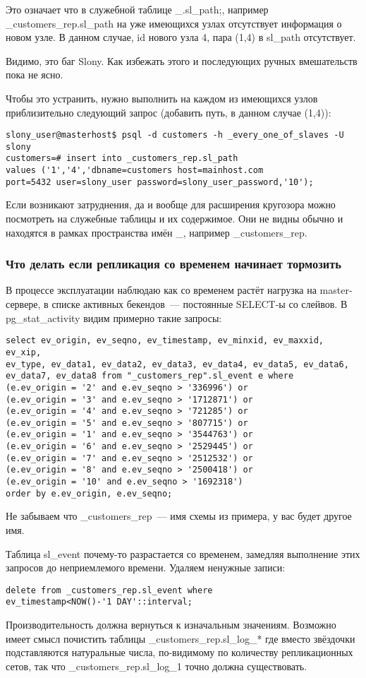 Это означает что в служебной таблице \_<имя кластера>.sl\_path;, например 
\_customers\_rep.sl\_path на уже имеющихся узлах отсутствует информация о новом узле. В данном случае, 
id нового узла 4, пара (1,4) в sl\_path отсутствует.

Видимо, это баг Slony. Как избежать этого и последующих ручных вмешательств пока не ясно.

Чтобы это устранить, нужно выполнить на каждом из имеющихся узлов приблизительно следующий запрос 
(добавить путь, в данном случае (1,4)):
\begin{verbatim}
slony_user@masterhost$ psql -d customers -h _every_one_of_slaves -U slony
customers=# insert into _customers_rep.sl_path 
values ('1','4','dbname=customers host=mainhost.com 
port=5432 user=slony_user password=slony_user_password,'10');
\end{verbatim}

Если возникают затруднения, да и вообще для расширения кругозора можно посмотреть на служебные таблицы 
и их содержимое. Они не видны обычно и находятся в рамках пространства имён \_<имя кластера>, 
например \_customers\_rep. 

\subsubsection{Что делать если репликация со временем начинает тормозить}
В процессе эксплуатации наблюдаю как со временем растёт нагрузка на master-сервере, в списке активных бекендов~--- 
постоянные SELECT-ы со слейвов. В pg\_stat\_activity видим примерно такие запросы:
\begin{verbatim}
select ev_origin, ev_seqno, ev_timestamp, ev_minxid, ev_maxxid, ev_xip, 
ev_type, ev_data1, ev_data2, ev_data3, ev_data4, ev_data5, ev_data6, 
ev_data7, ev_data8 from "_customers_rep".sl_event e where 
(e.ev_origin = '2' and e.ev_seqno > '336996') or 
(e.ev_origin = '3' and e.ev_seqno > '1712871') or 
(e.ev_origin = '4' and e.ev_seqno > '721285') or 
(e.ev_origin = '5' and e.ev_seqno > '807715') or 
(e.ev_origin = '1' and e.ev_seqno > '3544763') or 
(e.ev_origin = '6' and e.ev_seqno > '2529445') or 
(e.ev_origin = '7' and e.ev_seqno > '2512532') or 
(e.ev_origin = '8' and e.ev_seqno > '2500418') or 
(e.ev_origin = '10' and e.ev_seqno > '1692318') 
order by e.ev_origin, e.ev_seqno;
\end{verbatim}

Не забываем что \_customers\_rep~--- имя схемы из примера, у вас будет другое имя.

Таблица sl\_event почему-то разрастается со временем, замедляя выполнение этих 
запросов до неприемлемого времени. Удаляем ненужные записи:
\begin{verbatim}
delete from _customers_rep.sl_event where 
ev_timestamp<NOW()-'1 DAY'::interval;
\end{verbatim}

Производительность должна вернуться к изначальным значениям. 
Возможно имеет смысл почистить таблицы \_customers\_rep.sl\_log\_* где 
вместо звёздочки подставляются натуральные числа, по-видимому по 
количеству репликационных сетов, так что \_customers\_rep.sl\_log\_1 
точно должна существовать. 
